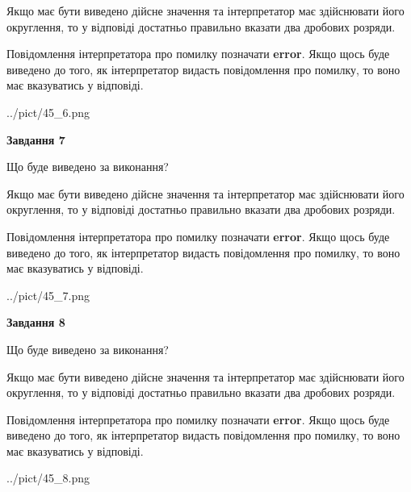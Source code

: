 \documentclass[12pt, ukrainian]{article}
\begin{document}
{\begin {Large}
Якщо має бути виведено дійсне значення та інтерпретатор має здійснювати його округлення, 
то у відповіді достатньо правильно вказати два дробових розряди.

Повідомлення інтерпретатора про помилку позначати \textbf{error}.
Якщо щось буде виведено до того, як інтерпретатор видасть повідомлення про помилку, 
то воно має вказуватись у відповіді. \par

\begin{center}
	{../pict/45_6.png}
\end{center}
\newpage

{\begin {center}\textbf{Завдання 7}\end {center}}\par
Що буде виведено за виконання? \par

Якщо має бути виведено дійсне значення та інтерпретатор має здійснювати його округлення, 
то у відповіді достатньо правильно вказати два дробових розряди.

Повідомлення інтерпретатора про помилку позначати \textbf{error}.
Якщо щось буде виведено до того, як інтерпретатор видасть повідомлення про помилку, 
то воно має вказуватись у відповіді. \par

\begin{center}
	{../pict/45_7.png}
\end{center}
\newpage

{\begin {center}\textbf{Завдання 8}\end {center}}\par
Що буде виведено за виконання? \par

Якщо має бути виведено дійсне значення та інтерпретатор має здійснювати його округлення, 
то у відповіді достатньо правильно вказати два дробових розряди.

Повідомлення інтерпретатора про помилку позначати \textbf{error}.
Якщо щось буде виведено до того, як інтерпретатор видасть повідомлення про помилку, 
то воно має вказуватись у відповіді. \par

\begin{center}
	{../pict/45_8.png}
\end{center}
\newpage


\end{Large}}
\end{document}
